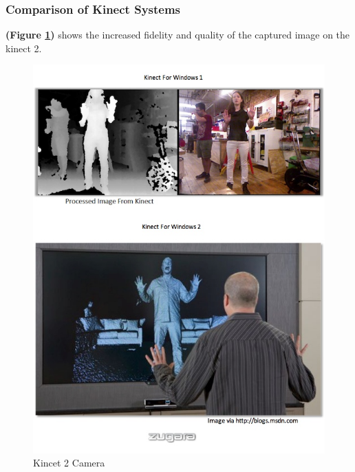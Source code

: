 \documentclass[a4paper,10pt,twoside]{article}
\begin{document}
\subsubsection{Comparison of Kinect Systems}
\textbf{(Figure \ref{fig:kimg})} shows the increased fidelity and quality of the captured image on the kinect 2.
\begin{figure}[H]
	\centerline{\includegraphics[scale=0.5]{kinectImg.jpg}}
	\caption{Kincet 2 Camera}
	\label{fig:kimg}
	\end{figure}
	\pagebreak	
	
\end{document}
